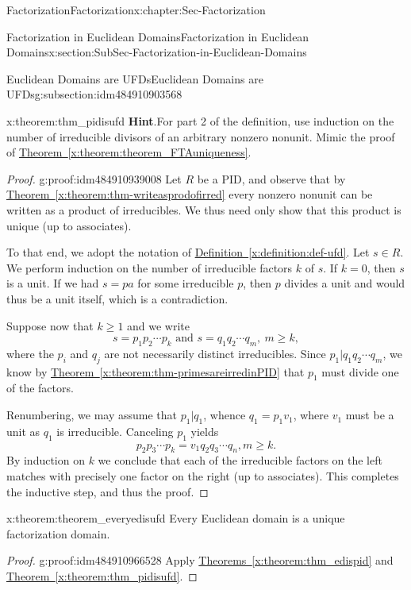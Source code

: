 \documentclass[oneside,10pt,]{book}
\newcommand{\blocktitlefont}{\relax}
\newcommand{\xreffont}{\relax}
\numberwithin{equation}{section}
\renewcommand{\ge}{\geqslant}
\begin{document}
\begin{chapterptx}{Factorization}{}{Factorization}{}{}{x:chapter:Sec-Factorization}
\begin{sectionptx}{Factorization in Euclidean Domains}{}{Factorization in Euclidean Domains}{}{}{x:section:SubSec-Factorization-in-Euclidean-Domains}
\begin{subsectionptx}{Euclidean Domains are UFDs}{}{Euclidean Domains are UFDs}{}{}{g:subsection:idm484910903568}
\begin{theorem}{}{}{x:theorem:thm_pidisufd}
\textbf{\blocktitlefont Hint}.\quad{}For part 2 of the definition, use induction on the number of irreducible divisors of an arbitrary nonzero nonunit. Mimic the proof of \hyperref[x:theorem:theorem_FTAuniqueness]{Theorem~{\xreffont\ref{x:theorem:theorem_FTAuniqueness}}}.\end{theorem}
\begin{proof}{}{g:proof:idm484910939008}
Let \(R\) be a PID, and observe that by \hyperref[x:theorem:thm-writeasprodofirred]{Theorem~{\xreffont\ref{x:theorem:thm-writeasprodofirred}}} every nonzero nonunit can be written as a product of irreducibles. We thus need only show that this product is unique (up to associates).%
\par
To that end, we adopt the notation of \hyperref[x:definition:def-ufd]{Definition~{\xreffont\ref{x:definition:def-ufd}}}. Let \(s\in R\). We perform induction on the number of irreducible factors \(k\) of \(s\). If \(k=0\), then \(s\) is a unit. If we had \(s = pa\) for some irreducible \(p\), then \(p\) divides a unit and would thus be a unit itself, which is a contradiction.%
\par
Suppose now that \(k\ge 1\) and we write%
\begin{equation*}
s = p_1 p_2 \cdots p_k \text{ and }  s = q_1 q_2 \cdots q_m, \ m \ge k,
\end{equation*}
where the \(p_i\) and \(q_j\) are not necessarily distinct irreducibles. Since \(p_1 | q_1 q_2 \cdots q_m\), we know by \hyperref[x:theorem:thm-primesareirredinPID]{Theorem~{\xreffont\ref{x:theorem:thm-primesareirredinPID}}} that \(p_1\) must divide one of the factors.%
\par
Renumbering, we may assume that \(p_1 | q_1\), whence \(q_1 = p_1 v_1\), where \(v_1\) must be a unit as \(q_1\) is irreducible. Canceling \(p_1\) yields%
\begin{equation*}
p_2 p_3 \cdots p_k = v_1 q_2 q_3 \cdots q_n, m\ge k.
\end{equation*}
By induction on \(k\) we conclude that each of the irreducible factors on the left matches with precisely one factor on the right (up to associates). This completes the inductive step, and thus the proof.%
\end{proof}
\begin{theorem}{}{}{x:theorem:theorem_everyedisufd}%
Every Euclidean domain is a unique factorization domain.%
\end{theorem}
\begin{proof}{}{g:proof:idm484910966528}
Apply \hyperref[x:theorem:thm_edispid]{Theorems~{\xreffont\ref{x:theorem:thm_edispid}}} and \hyperref[x:theorem:thm_pidisufd]{Theorem~{\xreffont\ref{x:theorem:thm_pidisufd}}}.%

\end{proof}
\end{subsectionptx}
\end{sectionptx}
\end{chapterptx}
\end{document}
